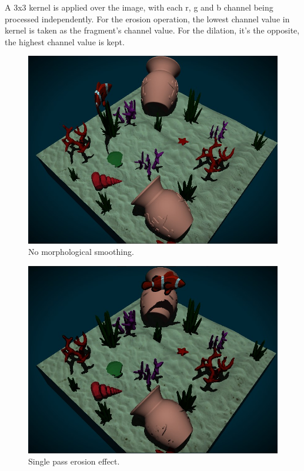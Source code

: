 \documentclass{article}
\begin{document}
\medskip \par
\noindent
A 3x3 kernel is applied over the image, with each r, g and b channel being processed independently. For the 
erosion operation, the lowest channel value in kernel is taken as the fragment's channel value. 
For the dilation, it's the opposite, the highest channel value is kept.

\begin{figure}[h]
    \centering
    \includegraphics[width=\columnwidth]{imgs/no_smoothing_2.jpg}
    \caption{No morphological smoothing.}
    \label{fig:no_ms}
\end{figure}

\begin{figure}[h]
    \centering
    \includegraphics[width=\columnwidth]{imgs/erosion.jpg}
    \caption{Single pass erosion effect.}
    \label{fig:erosion_ms}
\end{figure}
\end{document}

